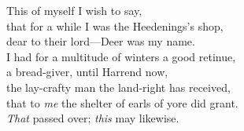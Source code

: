 \bvb This of myself I wish to say, \\
that for a while I was the Heedenings’s shop, \\
dear to their lord—Deer was my name. \\
I had for a multitude of winters a good retinue, \\
a  bread-giver, until Harrend now, \\
the lay-crafty man the land-right has received, \\
that to \emph{me} the shelter of earls of yore did grant. \\
\emph{That} passed over; \emph{this} may likewise.\evb\evg

\sectionline
